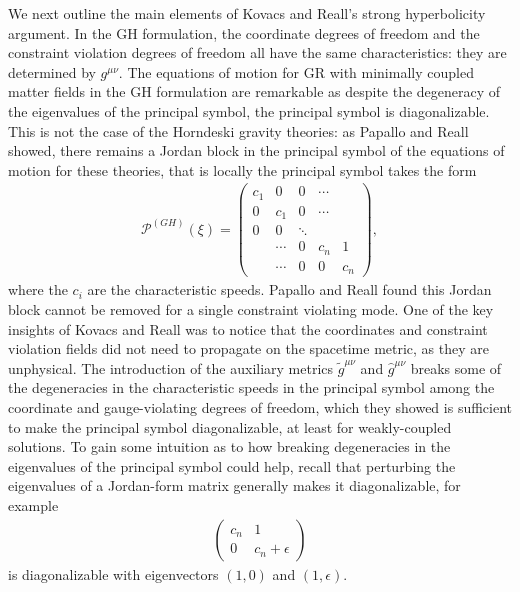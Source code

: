 \documentclass{ws-ijmpd}
\begin{document}
We next outline the main elements of Kovacs and Reall's
strong hyperbolicity argument. 
In the GH formulation, 
the coordinate degrees of freedom and the constraint violation
degrees of freedom all have the same characteristics:
they are determined by $g^{\mu\nu}$.
The equations of motion for GR with minimally coupled matter fields 
in the GH formulation are remarkable 
as despite the degeneracy of the eigenvalues of the principal symbol,
the principal symbol is diagonalizable.
This is not the case of the Horndeski gravity theories: as
Papallo and Reall showed\cite{Papallo:2017qvl,Papallo:2017ddx},
there remains a Jordan block in the principal symbol of the
equations of motion for these theories, that is locally
the principal symbol takes the form
\begin{align}
   \mathcal{P}^{(GH)}\left(\xi\right)
   =
   \begin{pmatrix}
      c_1 & 0      & 0      & \cdots   \\
      0   & c_1    & 0      & \cdots   \\
      0   & 0      & \ddots            \\
          & \cdots & 0      & c_n & 1  \\
          & \cdots & 0      & 0   & c_n
   \end{pmatrix}
   ,
\end{align}
where the $c_i$ are the characteristic speeds. 
Papallo and Reall found this Jordan block cannot
be removed for a single constraint violating mode.
One of the key insights of Kovacs and Reall was to notice that the
coordinates and constraint violation fields did not
need to propagate on the spacetime metric, 
as they are unphysical.
The introduction of the auxiliary metrics $\tilde{g}^{\mu\nu}$
and $\hat{g}^{\mu\nu}$ breaks some of the degeneracies in the
characteristic speeds in the principal symbol
among the coordinate and gauge-violating degrees of freedom, 
which they showed is sufficient to make the principal symbol diagonalizable, 
at least for weakly-coupled solutions\cite{Kovacs:2020pns,Kovacs:2020ywu}.
To gain some intuition as to how breaking degeneracies in the eigenvalues
of the principal symbol could help, recall that perturbing
the eigenvalues of a Jordan-form matrix generally makes it
diagonalizable, for example 
\begin{align}
   \begin{pmatrix}
      c_n & 1 \\
      0   & c_n+\epsilon
   \end{pmatrix}
\end{align}
is diagonalizable 
with eigenvectors $(1,0)$ and $(1,\epsilon)$.
\end{document}
